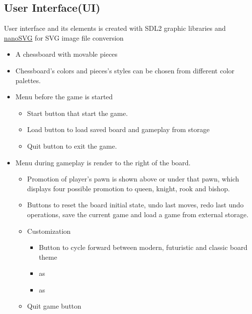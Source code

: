 \documentclass[a4paper, 10pt, titlepage]{article}
\begin{document}
\subsection{User Interface(UI)}
User interface and its elements is created with SDL2 graphic libraries and \href{https://github.com/memononen/nanosvg}{nanoSVG} for SVG image file conversion
\begin{itemize}
    \item A chessboard with movable pieces
    \item Chessboard's colors and pieces's styles can be chosen from different color palettes.

    \item Menu before the game is started
          \begin{itemize}
              \item Start button that start the game.
              \item Load button to load saved board and gameplay from storage
              \item Quit button to exit the game.
          \end{itemize}
    \item Menu during gameplay is render to the right of the board.
          \begin{itemize}
              \item Promotion of player's pawn is shown above or under that pawn, which displays four possible promotion to queen, knight, rook and bishop.
              \item Buttons to reset the board initial state, undo last moves, redo last undo operations, save the current game and load a game from external storage.
              \item Customization
                    \begin{itemize}
                        \item Button to cycle forward between modern, futuristic and classic board theme
                        \item as
                        \item as
                    \end{itemize}
              \item Quit game button
          \end{itemize}
\end{itemize}
\end{document}
